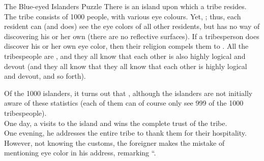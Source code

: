 
\begin{frame}{}
  \begin{exampleblock}{The Blue-eyed Islanders Puzzle}
    There is an island upon which a tribe resides. \pause
    The tribe consists of 1000 people, with various eye colours. \pause
    Yet, ; \pause
    thus, each resident can (and does) see the eye colors of all other residents,
    but has no way of discovering his or her own (there are no reflective surfaces). \pause
    If a tribesperson does discover his or her own eye color,
    then their religion compels them to
    . \pause
    All the tribespeople are ,
    and they all know that each other is also highly logical and devout
    (and they all know that they all know that each other is highly logical and devout,
    and so forth).
  \end{exampleblock}
\end{frame}

\begin{frame}{}
  \begin{exampleblock}{}
    Of the 1000 islanders,
    it turns out that ,
    although the islanders are not initially aware of these statistics
    (each of them can of course only see 999 of the 1000 tribespeople). \pause\\[6pt]

    One day, a  visits to the island
    and wins the complete trust of the tribe. \pause\\[6pt]

    One evening, he addresses the entire tribe to thank them
    for their hospitality. \pause\\[6pt]

    However, not knowing the customs,
    the foreigner makes the mistake of mentioning eye color in his address,
    remarking ``. \pause\\[6pt]

  \end{exampleblock}
\end{frame}

